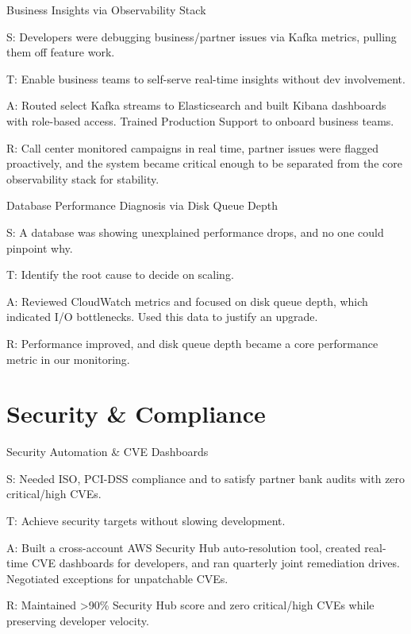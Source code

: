 \documentclass[11pt]{article}
\begin{document}
\begin{starstory}{Business Insights via Observability Stack}
\begin{starlist}
\item[S:] Developers were debugging business/partner issues via Kafka metrics, pulling them off feature work.
\item[T:] Enable business teams to self-serve real-time insights without dev involvement.
\item[A:] Routed select Kafka streams to Elasticsearch and built Kibana dashboards with role-based access. Trained Production Support to onboard business teams.
\item[R:] Call center monitored campaigns in real time, partner issues were flagged proactively, and the system became critical enough to be separated from the core observability stack for stability.
\end{starlist}
\end{starstory}

\begin{starstory}{Database Performance Diagnosis via Disk Queue Depth}
\begin{starlist}
\item[S:] A database was showing unexplained performance drops, and no one could pinpoint why.
\item[T:] Identify the root cause to decide on scaling.
\item[A:] Reviewed CloudWatch metrics and focused on disk queue depth, which indicated I/O bottlenecks. Used this data to justify an upgrade.
\item[R:] Performance improved, and disk queue depth became a core performance metric in our monitoring.
\end{starlist}
\end{starstory}

\section{Security \& Compliance}

\begin{starstory}{Security Automation \& CVE Dashboards}
\begin{starlist}
\item[S:] Needed ISO, PCI-DSS compliance and to satisfy partner bank audits with zero critical/high CVEs.
\item[T:] Achieve security targets without slowing development.
\item[A:] Built a cross-account AWS Security Hub auto-resolution tool, created real-time CVE dashboards for developers, and ran quarterly joint remediation drives. Negotiated exceptions for unpatchable CVEs.
\item[R:] Maintained >90\% Security Hub score and zero critical/high CVEs while preserving developer velocity.
\end{starlist}
\end{starstory}
\end{document}
